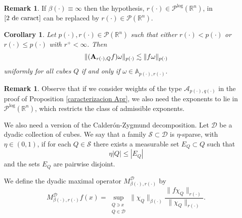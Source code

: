 \documentclass[a4paper,11pt,reqno]{amsart}
\theoremstyle{plain}
\numberwithin{equation}{section}
\newtheorem{coro}[teo]{Corollary}
\theoremstyle{definition}
\newtheorem{remark}[teo]{Remark}
\newcommand{\R}{{\mathbb{R}^n}}
\begin{document}
\begin{remark}
	If $\beta(\cdot)\equiv\infty$ then the hypothesis, $r(\cdot)\in\mathcal{P}^{\text{log}}(\R)$, in $\eqref{2 de caract}$ can be replaced by $r(\cdot)\in\mathcal{P}(\R)$. 
\end{remark}
\begin{coro}
	Let $p(\cdot),r(\cdot)\in \mathcal{P}(\R)$ such that either ${r(\cdot)}<{p(\cdot)}$ or ${r(\cdot)}\leq{p(\cdot)}$ with $r^+<\infty$. Then $$\|({\bf A}_{r(\cdot),Q}f)\omega\|_{p(\cdot)}\lesssim\|f\omega\|_{p(\cdot)}$$
	uniformly for all cubes $Q$ if and only if $\omega\in \mathbb{A}_{p(\cdot),r(\cdot)}$.	
\end{coro}
\begin{remark}
	Observe that if we consider weights of the type $\mathcal{A}_{p(\cdot),q(\cdot)}$ in the proof of Proposition \ref{caracterizacion Apr}, we also need the exponents to lie in $\mathcal{P}^{\text{log}}(\R)$, which restricts the class of admissible exponents.
\end{remark}	


We also need a version of the Calderón-Zygmund decomposition. Let $\mathcal{D}$ be a dyadic collection of cubes. We say that a family $\mathcal{S}\subset\mathcal{D}$ is $\eta$-sparse, with $\eta\in(0,1)$, if for each $Q\in \mathcal{S}$ there exists a measurable set $E_Q\subset Q$ such that 
	$$\eta|Q|\leq |E_Q|$$
	and the sets $E_Q$ are pairwise disjoint. 
	
 We define the dyadic maximal operator $M^{\mathcal{D}}_{\beta(\cdot),r(\cdot)}$ by
	\begin{equation*}
		M^{\mathcal{D}}_{\beta(\cdot),r(\cdot)}f(x)=\sup_{\substack{Q\ni x\\ Q\in\mathcal{D}}}\|\chi_Q\|_{\beta(\cdot)}\frac{\|f\chi_Q\|_{r(\cdot)}}{\|\chi_Q\|_{r(\cdot)}}.
	\end{equation*}
\end{document}
